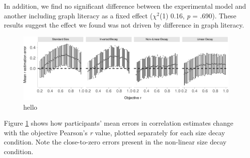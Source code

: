 \documentclass{vgtc}                          %
\begin{document}
In addition, we find no significant difference between the experimental model
and another including graph literacy as a fixed effect (\(\chi^2\)(1)
0.16, \emph{p} = .690).
These results suggest the effect we found was not driven by difference in graph literacy.

\begin{figure}
\includegraphics{size_and_scatterplots_files/figure-latex/changes-with-r-size-1} \caption{hello}\label{fig:changes-with-r-size}
\end{figure}

Figure \ref{fig:changes-with-r-size} shows how participants' mean errors in correlation
estimates change with the objective Pearson's \emph{r} value, plotted separately for each
size decay condition. Note the close-to-zero errors present in the non-linear size
decay condition.


%

%
%
%


\end{document}
